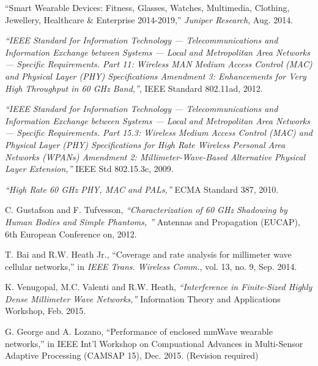 \documentclass[10pt, conference, letterpaper]{IEEEtran}
\begin{document}
\begin{thebibliography}{50}
``Smart Wearable Devices: Fitness, Glasses, Watches, Multimedia, Clothing, Jewellery, Healthcare \& Enterprise 2014-2019,'' \emph{Juniper Research}, Aug. 2014.

\emph{``IEEE Standard for Information Technology — Telecommunications and Information Exchange between Systems — Local and Metropolitan Area Networks — Specific Requirements. Part 11: Wireless MAN Medium Access Control (MAC) and Physical Layer (PHY) Specifications Amendment 3: Enhancements for Very High Throughput in 60 GHz Band,''}, IEEE Standard 802.11ad, 2012.

\emph{``IEEE Standard for Information Technology — Telecommunications and Information Exchange between Systems — Local and Metropolitan Area Networks — Specific Requirements. Part 15.3: Wireless Medium Access Control (MAC) and Physical Layer (PHY) Specifications for High Rate Wireless Personal Area Networks (WPANs) Amendment 2: Millimeter-Wave-Based Alternative Physical Layer Extension,''} IEEE Std 802.15.3c, 2009.

\emph{``High Rate 60 GHz PHY, MAC and PALs,''} ECMA Standard 387, 2010.


C. Gustafson and F. Tufvesson, \emph{``Characterization of 60 GHz Shadowing by Human Bodies and Simple Phantoms, ''} Antennas and Propagation (EUCAP), 6th European Conference on, 2012.

T. Bai and R.W. Heath Jr., ``Coverage and rate analysis for millimeter wave cellular networks,'' in \emph{IEEE Trans. Wireless Comm.}, vol. 13, no. 9, Sep. 2014.

K. Venugopal, M.C. Valenti and R.W. Heath, \emph{``Interference in Finite-Sized Highly Dense Millimeter Wave Networks,''} Information Theory and Applications Workshop, Feb. 2015.

G. George and A. Lozano, ``Performance of enclosed mmWave wearable networks,'' in IEEE Int'l Workshop on Compuational Advances in Multi-Sensor Adaptive Processing (CAMSAP 15), Dec. 2015. (Revision required)


\end{thebibliography}
\end{document}
